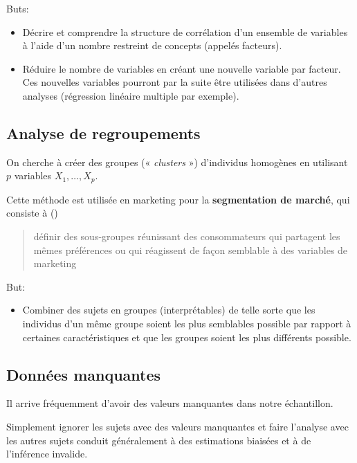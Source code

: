 \documentclass[
  11pt,
  letterpaper,
]{scrbook}
\providecommand{\tightlist}{%
  \setlength{\itemsep}{0pt}\setlength{\parskip}{0pt}}\usepackage{longtable,booktabs,array}
\theoremstyle{definition}
\theoremstyle{remark}
\begin{document}
Buts:

\begin{itemize}
\tightlist
\item
  Décrire et comprendre la structure de corrélation d'un ensemble de
  variables à l'aide d'un nombre restreint de concepts (appelés
  facteurs).
\item
  Réduire le nombre de variables en créant une nouvelle variable par
  facteur. Ces nouvelles variables pourront par la suite être utilisées
  dans d'autres analyses (régression linéaire multiple par exemple).
\end{itemize}

\subsection{Analyse de regroupements}\label{analyse-de-regroupements}

On cherche à créer des groupes (« \emph{clusters} ») d'individus
homogènes en utilisant \(p\) variables \(X_1, \ldots, X_p\).

Cette méthode est utilisée en marketing pour la \textbf{segmentation de
marché}, qui consiste à ()

\begin{quote}
définir des sous-groupes réunissant des consommateurs qui partagent les
mêmes préférences ou qui réagissent de façon semblable à des variables
de marketing
\end{quote}

But:

\begin{itemize}
\tightlist
\item
  Combiner des sujets en groupes (interprétables) de telle sorte que les
  individus d'un même groupe soient les plus semblables possible par
  rapport à certaines caractéristiques et que les groupes soient les
  plus différents possible.
\end{itemize}

\subsection{Données manquantes}\label{donnuxe9es-manquantes}

Il arrive fréquemment d'avoir des valeurs manquantes dans notre
échantillon.

Simplement ignorer les sujets avec des valeurs manquantes et faire
l'analyse avec les autres sujets conduit généralement à des estimations
biaisées et à de l'inférence invalide.
\end{document}
